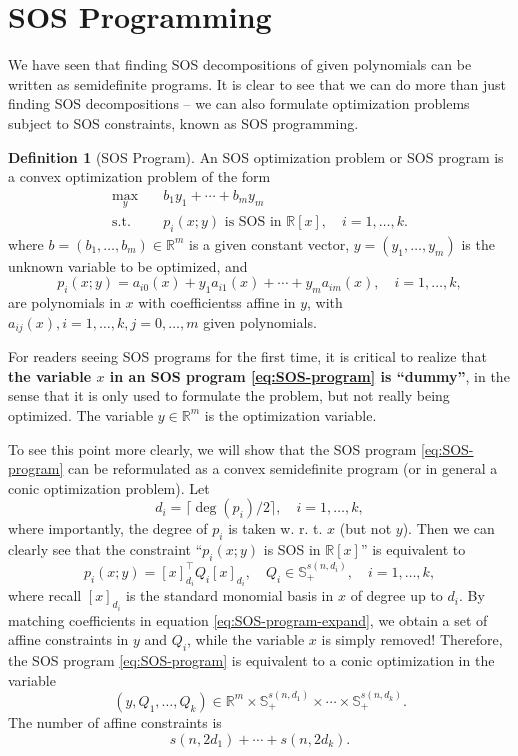 \documentclass[
]{book}
\theoremstyle{definition}
\newtheorem{definition}{Definition}[chapter]
\theoremstyle{definition}
\theoremstyle{definition}
\theoremstyle{definition}
\theoremstyle{remark}
\begin{document}
\section{SOS Programming}\label{sos-programming}

We have seen that finding SOS decompositions of given polynomials can be written as semidefinite programs. It is clear to see that we can do more than just finding SOS decompositions -- we can also formulate optimization problems subject to SOS constraints, known as SOS programming.

\begin{definition}[SOS Program]
\protect\hypertarget{def:SOSProgram}{}\label{def:SOSProgram}An SOS optimization problem or SOS program is a convex optimization problem of the form
\begin{equation}
\begin{split}
\max_y & \quad b_1 y_1 + \cdots + b_m y_m \\
\mathrm{s.t.}& \quad p_i(x;y) \text{ is SOS in } \mathbb{R}[x], \quad i=1,\dots,k.
\end{split}
\label{eq:SOS-program}
\end{equation}
where \(b = (b_1,\dots,b_m) \in \mathbb{R}^{m}\) is a given constant vector, \(y= (y_1,\dots,y_m)\) is the unknown variable to be optimized, and
\[
p_i(x;y) = a_{i0}(x) + y_1 a_{i1}(x) + \cdots + y_m a_{im}(x), \quad i=1,\dots,k,
\]
are polynomials in \(x\) with coefficientss affine in \(y\), with \(a_{ij}(x),i=1,\dots,k, j=0,\dots,m\) given polynomials.
\end{definition}

For readers seeing SOS programs for the first time, it is critical to realize that \textbf{the variable \(x\) in an SOS program \eqref{eq:SOS-program} is ``dummy''}, in the sense that it is only used to formulate the problem, but not really being optimized. The variable \(y \in \mathbb{R}^{m}\) is the optimization variable.

To see this point more clearly, we will show that the SOS program \eqref{eq:SOS-program} can be reformulated as a convex semidefinite program (or in general a conic optimization problem). Let
\[
d_i = \lceil \deg(p_i)/2 \rceil, \quad i=1,\dots,k,
\]
where importantly, the degree of \(p_i\) is taken w. r. t. \(x\) (but not \(y\)). Then we can clearly see that the constraint ``\(p_i(x;y)\) is SOS in \(\mathbb{R}[x]\)'' is equivalent to
\begin{equation}
p_i(x;y) = [x]_{d_i}^\top Q_i [x]_{d_i}, \quad Q_i \in \mathbb{S}^{s(n,d_i)}_{+}, \quad i=1,\dots,k,
\label{eq:SOS-program-expand}
\end{equation}
where recall \([x]_{d_i}\) is the standard monomial basis in \(x\) of degree up to \(d_i\). By matching coefficients in equation \eqref{eq:SOS-program-expand}, we obtain a set of affine constraints in \(y\) and \(Q_i\), while the variable \(x\) is simply removed! Therefore, the SOS program \eqref{eq:SOS-program} is equivalent to a conic optimization in the variable
\[
(y,Q_1,\dots,Q_k) \in \mathbb{R}^{m} \times \mathbb{S}^{s(n,d_1)}_{+} \times \cdots \times \mathbb{S}^{s(n,d_k)}_{+}.
\]
The number of affine constraints is
\[
s(n,2d_1) + \cdots + s(n,2d_k).
\]
\end{document}
